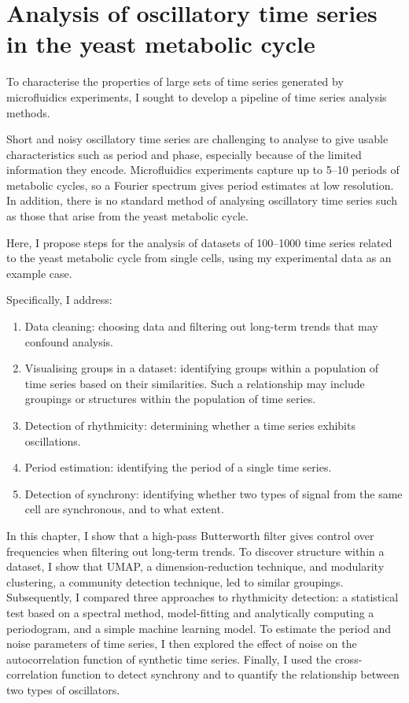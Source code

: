 \chapter{Analysis of oscillatory time series in the yeast metabolic cycle}
\label{ch:analysis}

To characterise the properties of large sets of time series generated by microfluidics experiments, I sought to develop a pipeline of time series analysis methods.

Short and noisy oscillatory time series are challenging to analyse to give usable characteristics such as period and phase, especially because of the limited information they encode.
Microfluidics experiments capture up to 5--10 periods of metabolic cycles, so a Fourier spectrum gives period estimates at low resolution.
In addition, there is no standard method of analysing oscillatory time series such as those that arise from the yeast metabolic cycle.

Here, I propose steps for the analysis of datasets of 100--1000 time series related to the yeast metabolic cycle from single cells, using my experimental data as an example case.

Specifically, I address:
\begin{enumerate}
  \item Data cleaning: choosing data and filtering out long-term trends that may confound analysis.
  \item Visualising groups in a dataset: identifying groups within a population of time series based on their similarities.
        Such a relationship may include groupings or structures within the population of time series.
  \item Detection of rhythmicity: determining whether a time series exhibits oscillations.
  \item Period estimation: identifying the period of a single time series.
  \item Detection of synchrony: identifying whether two types of signal from the same cell are synchronous, and to what extent.
\end{enumerate}

In this chapter, I show that a high-pass Butterworth filter gives control over frequencies when filtering out long-term trends.
To discover structure within a dataset, I show that UMAP, a dimension-reduction technique, and modularity clustering, a community detection technique, led to similar groupings.
Subsequently, I compared three approaches to rhythmicity detection: a statistical test based on a spectral method, model-fitting and analytically computing a periodogram, and a simple machine learning model.
To estimate the period and noise parameters of time series, I then explored the effect of noise on the autocorrelation function of synthetic time series.
Finally, I used the cross-correlation function to detect synchrony and to quantify the relationship between two types of oscillators.


